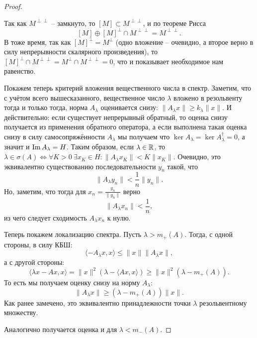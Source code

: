 \begin{proof}
\begin{note}
        Так как $M^{\perp \perp}$ -- замкнуто, то $[M] \subset M^{\perp \perp}$, и по теореме Рисса
        \[
            [M] \oplus [M]^{\perp} \cap M^{\perp \perp} = M^{\perp \perp}.
        \]
        В тоже время, так как $[M]^\perp = M^\perp$ (одно вложение -- очевидно, а второе верно в силу непрерывности скалярного произведения), то $[M]^\perp \cap M^{\perp \perp} = M^\perp \cap M^{\perp \perp} = 0$, что и показывает необходимое нам равенство.
    \end{note}

    Покажем теперь критерий вложения вещественного числа в спектр.
    Заметим, что с учётом всего вышесказанного, вещественное число $\lambda$ вложено в резольвенту тогда и только тогда, норма $A_\lambda$ оценивается снизу: $\|A_\lambda x\| \geq k_\lambda \|x\|$.
    И действительно: если существует непрерывный обратный, то оценка снизу получается из применения обратного оператора, а если выполнена такая оценка снизу в силу самосопряжённости $A_\lambda$ мы получаем что $\ker A_\lambda = \ker A^\dagger_\lambda = 0$, а значит и $\operatorname{Im} A_\lambda = H$.
    Таким образом, если $\lambda \in \mathbb{R}$, то $\lambda \in \sigma(A) \Longleftrightarrow \forall K > 0 \ \exists x_K \in H\colon \|A_\lambda x_K\| < K\|x_K\|$. Очевидно, это эквивалентно существованию последовательности $y_n$ такой, что
    \[
        \|A_\lambda y_n\| < \frac{1}{n}\|y_n\|.
    \]
    Но, заметим, что тогда для $x_n = \frac{y_n}{\|y_n\|}$ верно 
    \[
        \|A_\lambda x_n\| < \frac{1}{n},
    \]
    из чего следует сходимость $A_\lambda x_n$ к нулю.

    Теперь покажем локализацию спектра.
    Пусть $\lambda > m_+(A)$.
    Тогда, с одной стороны, в силу КБШ:
    \[
        \langle -A_\lambda x, x \rangle \leq \|x\|\|A_\lambda x\|,
    \]
    а с другой стороны:
    \[
        \langle \lambda x - Ax, x \rangle = \|x\|^2 \left(\lambda - \langle Ax, x\rangle\right) \geq \|x\|^2(\lambda - m_+(A)).
    \]
    То есть мы получаем оценку снизу на норму $A_\lambda\colon$
    \[
        \|A_\lambda x\| \geq (\lambda - m_+(A))\|x\|.
    \]
    Как ранее замечено, это эквивалентно принадлежности точки $\lambda$ резольвентному множеству.

    Аналогично получается оценка и для $\lambda < m_-(A)$.


\end{proof}
